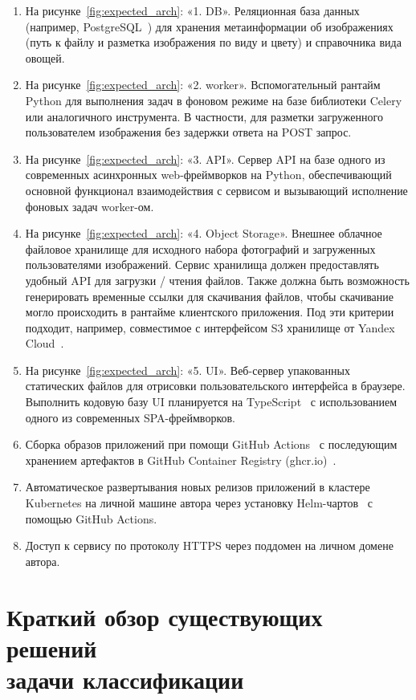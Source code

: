 \documentclass[a4paper,12pt]{extarticle}
\begin{document}
\begin{enumerate}
	\item На рисунке~\ref{fig:expected_arch}: «1. DB». Реляционная база данных
	(например, PostgreSQL~\cite{postgresql}) для хранения метаинформации об изображениях
	(путь к файлу и разметка изображения по виду и цвету) и справочника вида овощей.
	\item На рисунке~\ref{fig:expected_arch}: «2. worker». Вспомогательный рантайм Python для выполнения
	задач в фоновом режиме на базе библиотеки Celery~\cite{celery} или аналогичного инструмента. В частности, для
	разметки загруженного пользователем изображения без задержки ответа на POST запрос.
	\item На рисунке~\ref{fig:expected_arch}: «3. API». Сервер API на базе одного из современных
	асинхронных web-фреймворков на Python, обеспечивающий основной функционал взаимодействия с
	сервисом и вызывающий исполнение фоновых задач worker-ом.
	\item На рисунке~\ref{fig:expected_arch}: «4. Object Storage». Внешнее облачное файловое хранилище
	для исходного набора фотографий и загруженных пользователями изображений. Сервис хранилища должен
	предоставлять удобный API для загрузки / чтения файлов. Также должна быть возможность генерировать
	временные ссылки для скачивания файлов, чтобы скачивание могло происходить в рантайме клиентского
	приложения. Под эти критерии подходит, например, совместимое с интерфейсом S3 хранилище от
	Yandex Cloud~\cite{storage}.
	\item На рисунке~\ref{fig:expected_arch}: «5. UI». Веб-сервер упакованных статических файлов для
	отрисовки пользовательского интерфейса в браузере. Выполнить кодовую базу UI планируется на
	TypeScript~\cite{typescript} с использованием одного из современных SPA-фреймворков.
	\item Сборка образов приложений при помощи GitHub Actions~\cite{actions} с последующим хранением артефактов в
	GitHub Container Registry (ghcr.io)~\cite{ghcr}.
	\item Автоматическое развертывания новых релизов приложений в кластере Kubernetes на личной
	машине автора через установку Helm-чартов~\cite{helm} с помощью GitHub Actions. 
	\item Доступ к сервису по протоколу HTTPS через поддомен на личном домене автора.

\end{enumerate}
	
\newpage
\section[Краткий обзор существующих решений задачи классификации]{\texorpdfstring{Краткий обзор существующих решений\\ задачи классификации}{Краткий обзор существующих решений задачи классификации}}
\end{document}
